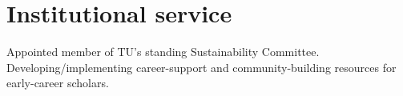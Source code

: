 \section{Institutional service}

Appointed member of TU's standing Sustainability Committee.
Developing/implementing career-support and community-building resources for early-career scholars.